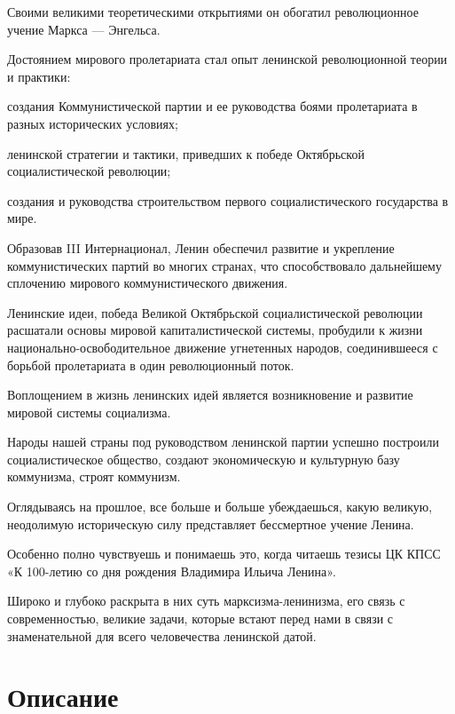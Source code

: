 \documentclass[12pt, a4paper, openany]{book}
\begin{document}
Своими великими теоретическими открытиями он обогатил революционное учение Маркса — Энгельса.

Достоянием мирового пролетариата стал опыт ленинской революционной теории и практики:

создания Коммунистической партии и ее руководства боями пролетариата в разных исторических условиях;

ленинской стратегии и тактики, приведших к победе Октябрьской социалистической революции;

создания и руководства строительством первого социалистического государства в мире.

Образовав III Интернационал, Ленин обеспечил развитие и укрепление коммунистических партий во многих странах, что способствовало дальнейшему сплочению мирового коммунистического движения.

Ленинские идеи, победа Великой Октябрьской социалистической революции расшатали основы мировой капиталистической системы, пробудили к жизни национально-освободительное движение угнетенных народов, соединившееся с борьбой пролетариата в один революционный поток.

Воплощением в жизнь ленинских идей является возникновение и развитие мировой системы социализма.

Народы нашей страны под руководством ленинской партии успешно построили социалистическое общество, создают экономическую и культурную базу коммунизма, строят коммунизм.

Оглядываясь на прошлое, все больше и больше убеждаешься, какую великую, неодолимую историческую силу представляет бессмертное учение Ленина.

Особенно полно чувствуешь и понимаешь это, когда читаешь тезисы ЦК КПСС «К 100-летию со дня рождения Владимира Ильича Ленина».

Широко и глубоко раскрыта в них суть марксизма-ленинизма, его связь с современностью, великие задачи, которые встают перед нами в связи с знаменательной для всего человечества ленинской датой.






	
	\newpage
	\tableofcontents
	
	\thispagestyle{empty} %
	
	\newpage
	
	\setcounter{secnumdepth}{0}
	
	
		\section*{Описание}
	
\end{document}
